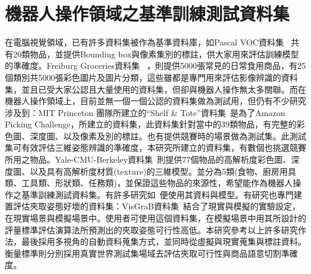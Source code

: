 \section{機器人操作領域之基準訓練測試資料集}
在電腦視覺領域，已有許多資料集被作為基準資料庫，如Pascal VOC資料集 ~\cite{everingham2010pascal}共有20類物品，並提供Bounding box與像素集別的標註，供大家用來評估訓練模型的準確度。Freiburg Groceries資料集 ~\cite{jund2016freiburg}，則提供5000張常見的日常食用商品，有25個類別共5000張彩色圖片及圖片分類，這些雖都是專門用來評估影像辨識的資料集，並且已受大家公認且大量使用的資料集，但卻與機器人操作無太多關聯。而在機器人操作領域上，目前並無一個一個公認的資料集做為測試用，但仍有不少研究涉及到：MIT Princeton 團隊所建立的``Shelf \& Tote''資料集~\cite{zeng2016multi}是為了Amazon Picking Challenge，所建立的資料集，此資料集針對當中的39類物品，有完整的彩色圖、深度圖、以及像素及別的標註。也有提供競賽時的場景做為測試集。此測試集可有效評估三維姿態辨識的準確度，本研究所建立的資料集，有數個也挑選競賽所用之物品。Yale-CMU-Berkeley資料集~\cite{calli2015benchmarking}則提供77個物品的高解析度彩色圖、深度圖、以及具有高解析度材質(texture)的三維模型。並分為5類(食物、廚房用具類、工具類、形狀類、任務類)，並保證這些物品的來源性，希望能作為機器人操作之基準訓練測試資料集。有許多研究如~\cite{mahler2016dex}便使用其資料與模型。有研究也專門建置評估夾取姿態好壞的資料集：VisGraB資料集~\cite{kootstra2012visgrab}結合了現實與模擬的實驗設定，在現實場景與模擬場景中。使用者可使用這個資料集，在模擬場景中用其所設計的評量標準評估演算法所預測出的夾取姿態可行性高低。本研究參考以上許多研究作法，最後採用多視角的自動資料蒐集方式，並同時從虛擬與現實蒐集與標註資料。衡量標準則分別採用真實世界測試集場域去評估夾取可行性與商品語意切割準確度。
